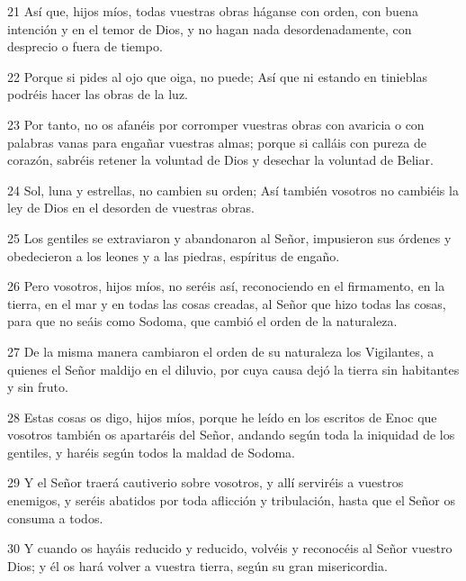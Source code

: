 \par 21 Así que, hijos míos, todas vuestras obras háganse con orden, con buena intención y en el temor de Dios, y no hagan nada desordenadamente, con desprecio o fuera de tiempo.

\par 22 Porque si pides al ojo que oiga, no puede; Así que ni estando en tinieblas podréis hacer las obras de la luz.

\par 23 Por tanto, no os afanéis por corromper vuestras obras con avaricia o con palabras vanas para engañar vuestras almas; porque si calláis con pureza de corazón, sabréis retener la voluntad de Dios y desechar la voluntad de Beliar.

\par 24 Sol, luna y estrellas, no cambien su orden; Así también vosotros no cambiéis la ley de Dios en el desorden de vuestras obras.

\par 25 Los gentiles se extraviaron y abandonaron al Señor, impusieron sus órdenes y obedecieron a los leones y a las piedras, espíritus de engaño.

\par 26 Pero vosotros, hijos míos, no seréis así, reconociendo en el firmamento, en la tierra, en el mar y en todas las cosas creadas, al Señor que hizo todas las cosas, para que no seáis como Sodoma, que cambió el orden de la naturaleza.

\par 27 De la misma manera cambiaron el orden de su naturaleza los Vigilantes, a quienes el Señor maldijo en el diluvio, por cuya causa dejó la tierra sin habitantes y sin fruto.

\par 28 Estas cosas os digo, hijos míos, porque he leído en los escritos de Enoc que vosotros también os apartaréis del Señor, andando según toda la iniquidad de los gentiles, y haréis según todos la maldad de Sodoma.

\par 29 Y el Señor traerá cautiverio sobre vosotros, y allí serviréis a vuestros enemigos, y seréis abatidos por toda aflicción y tribulación, hasta que el Señor os consuma a todos.

\par 30 Y cuando os hayáis reducido y reducido, volvéis y reconocéis al Señor vuestro Dios; y él os hará volver a vuestra tierra, según su gran misericordia.

